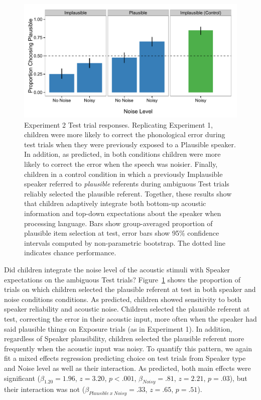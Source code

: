 \documentclass[man,floatsintext]{apa6}
\begin{document}
\begin{figure}[t]
     \centering
     \includegraphics[width=5in]{figures/exp2_results.pdf}
    \caption{Experiment 2 Test trial responses. Replicating Experiment 1, children were more likely to correct the phonological error during test trials when they were previously exposed to a Plausible speaker. In addition, as predicted, in both conditions children were more likely to correct the error when the speech was noisier. Finally, children in a control condition in which a previously Implausible speaker referred to \emph{plausible} referents during ambiguous Test trials reliably selected the plausible referent. Together, these results show that children adaptively integrate both bottom-up acoustic information and top-down expectations about the speaker when processing language. Bars show group-averaged proportion of plausible item selection at test, error bars show 95\% confidence intervals computed by non-parametric bootstrap. The dotted line indicates chance performance.}%
   \label{fig:exp2_results}
\end{figure}

Did children integrate the noise level of the acoustic stimuli with Speaker expectations on the ambiguous Test trials? Figure~\ref{fig:exp2_results} shows the proportion of trials on which children selected the plausible referent at test in both speaker and noise conditions conditions. As predicted, children showed sensitivity to both speaker reliability and acoustic noise. Children selected the plausible referent at test, correcting the error in their acoustic input, more often when the speaker had said plausible things on Exposure trials (as in Experiment 1). In addition, regardless of Speaker plausibility, children selected the plausible referent more frequently when the acoustic input was noisy. To quantify this pattern, we again fit a mixed effects regression predicting choice on test trials from Speaker type and Noise level as well as their interaction. As predicted, both main effects were significant ($\beta_{1.20} = 1.96$,  $z = 3.20$, $p <.001$, $\beta_{Noisy} = .81$,  $z = 2.21$, $p = .03$), but their interaction was not ($\beta_{Plausible \: x \: Noisy} = .33$,  $z = .65$, $p = .51$).
\end{document}
